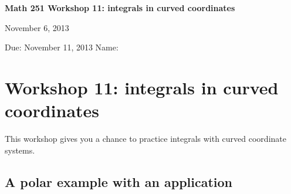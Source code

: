 \documentclass[12pt]{exam}
\theoremstyle{definition}
\begin{document}
\noindent
\textbf{{\large Math 251 \hfill Workshop 11: integrals in curved coordinates}}

\noindent
November 6, 2013 

\noindent
Due: November 11, 2013 \hfill Name: \underline{\hspace{3in}} 

\noindent

\section{Workshop 11: integrals in curved coordinates}

This workshop gives you a chance to practice integrals with curved
coordinate systems.

\subsection{A polar example with an application}
\end{document}
